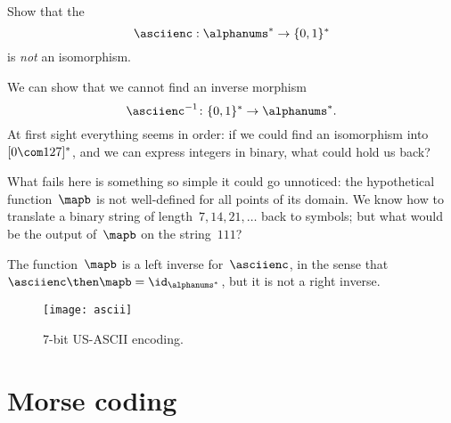 \begin{exercise}
    Show that the \whomo
    \begin{equation*}
        \label{eq:ascii-to-bin}
        \asciienc: \alphanums^* \to \{0,1\}^*
    \end{equation*}
    is \emph{not} an isomorphism.
\end{exercise}
\begin{solution}
    We can show that we cannot find an inverse morphism
    \begin{equation}
        \label{eq:bin-to-ascii}
        \asciienc^{-1}\colon  \{0,1\}^* \to \alphanums^*.
    \end{equation}
    At first sight everything seems in order: if we could find an isomorphism into~$[0\com 127]^*$, and we can express integers in binary, what could hold us back?

    What fails here is something so simple it could go unnoticed: the hypothetical function~$\mapb$ is not well-defined for all points of its domain.
    We know how to translate a binary string of length~$7,14,21,\ldots$ back to symbols; but what would be the output of~$\mapb$ on the string~$111$?

    The function~$\mapb$ is a left inverse for~$\asciienc$, in the sense that
    ~$\asciienc\then \mapb = \id_{\alphanums^*}$, but it is not a right inverse.

\end{solution}

\vfill
\begin{figure}[h]
    \texttt{[image: ascii]}
    \caption{7-bit US-ASCII encoding. \label{fig:asciifigure}}
\end{figure}

\section{Morse coding}

